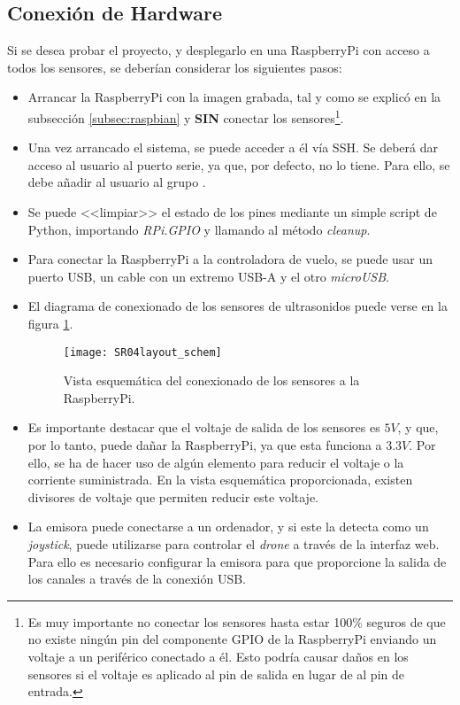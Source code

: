 \subsection{Conexión de Hardware}

Si se desea probar el proyecto, y desplegarlo en una RaspberryPi con acceso a todos los sensores, se deberían considerar los siguientes pasos: 

\begin{itemize}
\item Arrancar la RaspberryPi con la imagen grabada, tal y como se explicó en la subsección \ref{subsec:raspbian} y \textbf{SIN} conectar los sensores\footnote{Es muy importante no conectar los sensores hasta estar 100\% seguros de que no existe ningún pin del componente GPIO de la RaspberryPi enviando un voltaje a un periférico conectado a él. Esto podría causar daños en los sensores si el voltaje es aplicado al pin de salida en lugar de al pin de entrada.}.
\item Una vez arrancado el sistema, se puede acceder a él vía SSH. Se deberá dar acceso al usuario al puerto serie, ya que, por defecto, no lo tiene. Para ello, se debe añadir al usuario al grupo .
\item Se puede <<limpiar>> el estado de los pines mediante un simple script de Python, importando \emph{RPi.GPIO} y llamando al método \emph{cleanup}.
\item Para conectar la RaspberryPi a la controladora de vuelo, se puede usar un puerto USB, un cable con un extremo USB-A y el otro \emph{microUSB}.
\item El diagrama de conexionado de los sensores de ultrasonidos puede verse en la figura \ref{fig:concepHCPi}. 
\begin{figure}
	\centering
	\texttt{[image: SR04layout\_schem]}
	\caption[Diagrama de conexión de sensores a RaspberryPi]{Vista esquemática del conexionado de los sensores a la RaspberryPi.}\label{fig:concepHCPi}
\end{figure}
\item Es importante destacar que el voltaje de salida de los sensores es $5V$, y que, por lo tanto, puede dañar la RaspberryPi, ya que esta funciona a $3.3V$. Por ello, se ha de hacer uso de algún elemento para reducir el voltaje o la corriente suministrada. En la vista esquemática proporcionada, existen divisores de voltaje que permiten reducir este voltaje. 
\item La emisora puede conectarse a un ordenador, y si este la detecta como un \emph{joystick}, puede utilizarse para controlar el \emph{drone} a través de la interfaz web. Para ello es necesario configurar la emisora para que proporcione la salida de los canales a través de la conexión USB. 
\end{itemize}


